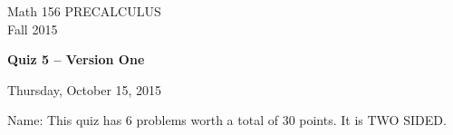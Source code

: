 \documentclass[11pt]{article}
\begin{document}
\begin{center}
\vspace{2in}

\huge{Math 156 PRECALCULUS \\
Fall 2015}

\vfill

\huge{\bf{Quiz 5 -- Version One}}\\

\vspace{0.5in}

\large{Thursday, October 15, 2015}\\

\vfill


{\huge{Name:{\underline{\hspace{2in}}}}}
\vfill
This quiz has 6 problems worth a total of 30 points. It is TWO SIDED. 
\vfill
\end{center}
\newpage
\restoregeometry
\end{document}
